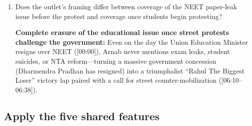 \documentclass[10pt,a4paper]{article}
\begin{document}
{\begin{enumerate}[leftmargin=1.5em, itemsep=6pt, topsep=4pt]
  \item Does the outlet's framing differ between coverage of the NEET paper-leak issue before the protest and coverage once students begin protesting?\par\smallskip
  \textbf{Complete erasure of the educational issue once street protests challenge the government:} Even on the day the Union Education Minister resigns over NEET ([00:00]), Arnab never mentions exam leaks, student suicides, or NTA reform---turning a massive government concession (Dharmendra Pradhan has resigned) into a triumphalist ``Rahul The Biggest Loser'' victory lap paired with a call for street counter-mobilization ([06:10--06:38]).
\end{enumerate}
}
\subsection*{Apply the five shared features}
\par\vspace{4pt}
\end{document}
